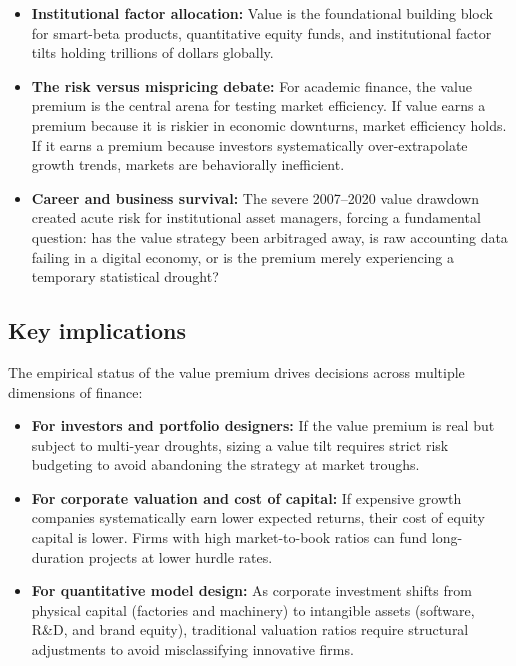 \begin{itemize}
  \item \textbf{Institutional factor allocation:} Value is the foundational building block for smart-beta products, quantitative equity funds, and institutional factor tilts holding trillions of dollars globally.
  \item \textbf{The risk versus mispricing debate:} For academic finance, the value premium is the central arena for testing market efficiency. If value earns a premium because it is riskier in economic downturns, market efficiency holds. If it earns a premium because investors systematically over-extrapolate growth trends, markets are behaviorally inefficient.
  \item \textbf{Career and business survival:} The severe 2007--2020 value drawdown created acute risk for institutional asset managers, forcing a fundamental question: has the value strategy been arbitraged away, is raw accounting data failing in a digital economy, or is the premium merely experiencing a temporary statistical drought?
\end{itemize}

\subsection{Key implications}

The empirical status of the value premium drives decisions across multiple dimensions of finance:

\begin{itemize}
  \item \textbf{For investors and portfolio designers:} If the value premium is real but subject to multi-year droughts, sizing a value tilt requires strict risk budgeting to avoid abandoning the strategy at market troughs.
  \item \textbf{For corporate valuation and cost of capital:} If expensive growth companies systematically earn lower expected returns, their cost of equity capital is lower. Firms with high market-to-book ratios can fund long-duration projects at lower hurdle rates.
  \item \textbf{For quantitative model design:} As corporate investment shifts from physical capital (factories and machinery) to intangible assets (software, R\&D, and brand equity), traditional valuation ratios require structural adjustments to avoid misclassifying innovative firms.
\end{itemize}

